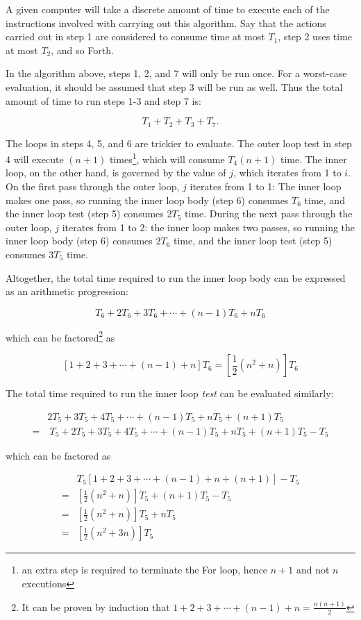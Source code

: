 \documentclass[12pt]{book} %
\begin{document}
A given computer will take a discrete amount of time to execute each of the instructions involved with carrying out this algorithm.  Say that the actions carried out in step 1 are considered to consume time at most $T_1$, step 2 uses time at most $T_2$, and so Forth.

In the algorithm above, steps 1, 2, and 7 will only be run once.  For a worst-case evaluation, it should be assumed that step 3 will be run as well.  Thus the total amount of time to run steps 1-3 and step 7 is:

\[
T_1 + T_2 + T_3 + T_7.
\]

The loops in steps 4, 5, and 6 are trickier to evaluate.  The outer loop test in step 4 will execute $(n + 1)$ times\footnote{an extra step is required to terminate the For loop, hence $n + 1$ and not $n$ executions}, which will consume $T_4(n + 1)$ time.  The inner loop, on the other hand, is governed by the value of $j$, which iterates from 1 to $i$.  On the first pass through the outer loop, $j$ iterates from 1 to 1:  The inner loop makes one pass, so running the inner loop body (step 6) consumes $T_6$ time, and the inner loop test (step 5) consumes $2T_5$ time.  During the next pass through the outer loop, $j$ iterates from 1 to 2:  the inner loop makes two passes, so running the inner loop body (step 6) consumes $2T_6$ time, and the inner loop test (step 5) consumes $3T_5$ time.

Altogether, the total time required to run the inner loop body can be expressed as an arithmetic progression:

\[
T_6 + 2T_6 + 3T_6 + \cdots + (n-1) T_6 + n T_6
\]

which can be factored\footnote{It can be proven by induction that $1 + 2 + 3 + \cdots + (n-1) + n = \frac{n(n+1)}{2}$} as

\[
\left[ 1 + 2 + 3 + \cdots + (n-1) + n \right] T_6 = \left[ \frac{1}{2} (n^2 + n) \right] T_6
\]

The total time required to run the inner loop \emph{test} can be evaluated similarly:

\begin{align}
& 2T_5 + 3T_5 + 4T_5 + \cdots + (n-1) T_5 + n T_5 + (n + 1) T_5\\
=&\ T_5 + 2T_5 + 3T_5 + 4T_5 + \cdots + (n-1)T_5 + nT_5 + (n+1)T_5 - T_5
\end{align}

which can be factored as

\begin{align}
& T_5 \left[ 1+2+3+\cdots + (n-1) + n + (n + 1) \right] - T_5 \\
=& \left[ \frac{1}{2} (n^2 + n) \right] T_5 + (n + 1)T_5 - T_5 \\
=& \left[ \frac{1}{2} (n^2 + n) \right] T_5 + n T_5 \\
=& \left[ \frac{1}{2} (n^2 + 3n) \right] T_5
\end{align}
\end{document}
